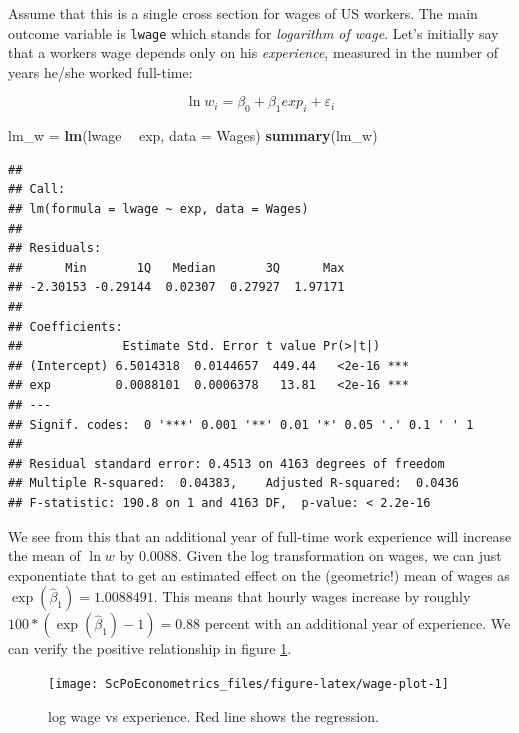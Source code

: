 \documentclass[]{book}
\newenvironment{Shaded}{\begin{snugshade}}{\end{snugshade}}
\newcommand{\KeywordTok}[1]{\textcolor[rgb]{0.13,0.29,0.53}{\textbf{#1}}}
\newcommand{\DataTypeTok}[1]{\textcolor[rgb]{0.13,0.29,0.53}{#1}}
\newcommand{\StringTok}[1]{\textcolor[rgb]{0.31,0.60,0.02}{#1}}
\newcommand{\OperatorTok}[1]{\textcolor[rgb]{0.81,0.36,0.00}{\textbf{#1}}}
\newcommand{\NormalTok}[1]{#1}
\theoremstyle{definition}
\theoremstyle{definition}
\theoremstyle{definition}
\theoremstyle{remark}
\begin{document}
Assume that this is a single cross section for wages of US workers. The
main outcome variable is \texttt{lwage} which stands for \emph{logarithm
of wage}. Let's initially say that a workers wage depends only on his
\emph{experience}, measured in the number of years he/she worked
full-time:

\[
\ln w_i = \beta_0 + \beta_1 exp_i + \varepsilon_i \label{eq:wage-exp}
\]

\begin{Shaded}
\begin{Highlighting}[]
\NormalTok{lm_w =}\StringTok{ }\KeywordTok{lm}\NormalTok{(lwage }\OperatorTok{~}\StringTok{ }\NormalTok{exp, }\DataTypeTok{data =}\NormalTok{ Wages)}
\KeywordTok{summary}\NormalTok{(lm_w)}
\end{Highlighting}
\end{Shaded}

\begin{verbatim}
## 
## Call:
## lm(formula = lwage ~ exp, data = Wages)
## 
## Residuals:
##      Min       1Q   Median       3Q      Max 
## -2.30153 -0.29144  0.02307  0.27927  1.97171 
## 
## Coefficients:
##              Estimate Std. Error t value Pr(>|t|)    
## (Intercept) 6.5014318  0.0144657  449.44   <2e-16 ***
## exp         0.0088101  0.0006378   13.81   <2e-16 ***
## ---
## Signif. codes:  0 '***' 0.001 '**' 0.01 '*' 0.05 '.' 0.1 ' ' 1
## 
## Residual standard error: 0.4513 on 4163 degrees of freedom
## Multiple R-squared:  0.04383,    Adjusted R-squared:  0.0436 
## F-statistic: 190.8 on 1 and 4163 DF,  p-value: < 2.2e-16
\end{verbatim}

We see from this that an additional year of full-time work experience
will increase the mean of \(\ln w\) by 0.0088. Given the log
transformation on wages, we can just exponentiate that to get an
estimated effect on the (geometric!) mean of wages as
\(\exp(\hat{\beta}_1) = 1.0088491\). This means that hourly wages
increase by roughly \(100 * (\exp(\hat{\beta}_1)-1) = 0.88\) percent
with an additional year of experience. We can verify the positive
relationship in figure \ref{fig:wage-plot}.

\begin{figure}

{\centering \texttt{[image: ScPoEconometrics\_files/figure-latex/wage-plot-1]} 

}

\caption{log wage vs experience. Red line shows the regression.}\label{fig:wage-plot}
\end{figure}
\end{document}
